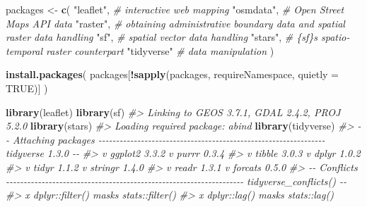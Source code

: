 \documentclass[
]{report}
\newenvironment{Shaded}{\begin{snugshade}}{\end{snugshade}}
\newcommand{\CommentTok}[1]{\textcolor[rgb]{0.56,0.35,0.01}{\textit{#1}}}
\newcommand{\DataTypeTok}[1]{\textcolor[rgb]{0.13,0.29,0.53}{#1}}
\newcommand{\KeywordTok}[1]{\textcolor[rgb]{0.13,0.29,0.53}{\textbf{#1}}}
\newcommand{\NormalTok}[1]{#1}
\newcommand{\OperatorTok}[1]{\textcolor[rgb]{0.81,0.36,0.00}{\textbf{#1}}}
\newcommand{\OtherTok}[1]{\textcolor[rgb]{0.56,0.35,0.01}{#1}}
\newcommand{\StringTok}[1]{\textcolor[rgb]{0.31,0.60,0.02}{#1}}
\begin{document}
\begin{Shaded}
\begin{Highlighting}[]
\NormalTok{packages \textless{}{-}}\StringTok{ }\KeywordTok{c}\NormalTok{(}
  \StringTok{"leaflet"}\NormalTok{,  }\CommentTok{\# interactive web mapping}
  \StringTok{"osmdata"}\NormalTok{,  }\CommentTok{\# Open Street Maps API data}
  \StringTok{"raster"}\NormalTok{,   }\CommentTok{\# obtaining administrative boundary data and spatial raster data handling}
  \StringTok{"sf"}\NormalTok{,       }\CommentTok{\# spatial vector data handling}
  \StringTok{"stars"}\NormalTok{,    }\CommentTok{\# \{sf\}\textquotesingle{}s spatio{-}temporal raster counterpart}
  \StringTok{"tidyverse"} \CommentTok{\# data manipulation}
\NormalTok{)}

\KeywordTok{install.packages}\NormalTok{(}
\NormalTok{  packages[}\OperatorTok{!}\KeywordTok{sapply}\NormalTok{(packages, requireNamespace, }\DataTypeTok{quietly =} \OtherTok{TRUE}\NormalTok{)]}
\NormalTok{)}

\KeywordTok{library}\NormalTok{(leaflet)}
\KeywordTok{library}\NormalTok{(sf)}
\CommentTok{\#\textgreater{} Linking to GEOS 3.7.1, GDAL 2.4.2, PROJ 5.2.0}
\KeywordTok{library}\NormalTok{(stars)}
\CommentTok{\#\textgreater{} Loading required package: abind}
\KeywordTok{library}\NormalTok{(tidyverse)}
\CommentTok{\#\textgreater{} {-}{-} Attaching packages {-}{-}{-}{-}{-}{-}{-}{-}{-}{-}{-}{-}{-}{-}{-}{-}{-}{-}{-}{-}{-}{-}{-}{-}{-}{-}{-}{-}{-}{-}{-}{-}{-}{-}{-}{-}{-}{-}{-}{-}{-}{-}{-}{-}{-}{-}{-}{-}{-}{-}{-}{-}{-}{-}{-}{-}{-}{-}{-}{-}{-}{-}{-}{-} tidyverse 1.3.0 {-}{-}}
\CommentTok{\#\textgreater{} v ggplot2 3.3.2     v purrr   0.3.4}
\CommentTok{\#\textgreater{} v tibble  3.0.3     v dplyr   1.0.2}
\CommentTok{\#\textgreater{} v tidyr   1.1.2     v stringr 1.4.0}
\CommentTok{\#\textgreater{} v readr   1.3.1     v forcats 0.5.0}
\CommentTok{\#\textgreater{} {-}{-} Conflicts {-}{-}{-}{-}{-}{-}{-}{-}{-}{-}{-}{-}{-}{-}{-}{-}{-}{-}{-}{-}{-}{-}{-}{-}{-}{-}{-}{-}{-}{-}{-}{-}{-}{-}{-}{-}{-}{-}{-}{-}{-}{-}{-}{-}{-}{-}{-}{-}{-}{-}{-}{-}{-}{-}{-}{-}{-}{-}{-}{-}{-}{-}{-}{-}{-}{-}{-} tidyverse\_conflicts() {-}{-}}
\CommentTok{\#\textgreater{} x dplyr::filter() masks stats::filter()}
\CommentTok{\#\textgreater{} x dplyr::lag()    masks stats::lag()}
\end{Highlighting}
\end{Shaded}
\end{document}
